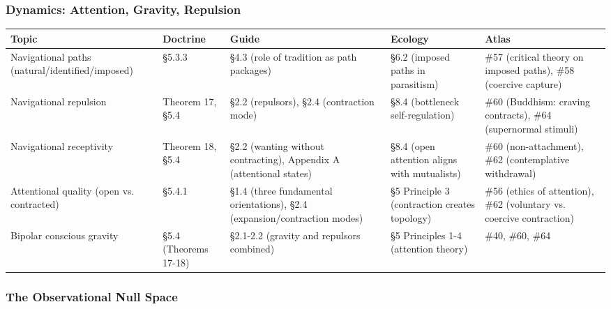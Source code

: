 \subsubsection*{Dynamics: Attention, Gravity, Repulsion}



{\small
\begin{longtable}{>{\raggedright\arraybackslash}p{} >{\raggedright\arraybackslash}p{} >{\raggedright\arraybackslash}p{} >{\raggedright\arraybackslash}p{} >{\raggedright\arraybackslash}p{}}
\toprule
\textbf{Topic} & \textbf{Doctrine} & \textbf{Guide} & \textbf{Ecology} & \textbf{Atlas} \\
\midrule
\endhead
Navigational paths (natural/\allowbreak identified/\allowbreak imposed) & §5.3.3 & §4.3 (role of tradition as path packages) & §6.2 (imposed paths in parasitism) & \#57 (critical theory on imposed paths), \#58 (coercive capture) \\
Navigational repulsion & Theorem 17, §5.4 & §2.2 (repulsors), §2.4 (contraction mode) & §8.4 (bottleneck self-regulation) & \#60 (Buddhism: craving contracts), \#64 (supernormal stimuli) \\
Navigational receptivity & Theorem 18, §5.4 & §2.2 (wanting without contracting), Appendix A (attentional states) & §8.4 (open attention aligns with mutualists) & \#60 (non-attachment), \#62 (contemplative withdrawal) \\
Attentional quality (open vs. contracted) & §5.4.1 & §1.4 (three fundamental orientations), §2.4 (expansion/\allowbreak contraction modes) & §5 Principle 3 (contraction creates topology) & \#56 (ethics of attention), \#62 (voluntary vs. coercive contraction) \\
Bipolar conscious gravity & §5.4 (Theorems 17-18) & §2.1-2.2 (gravity and repulsors combined) & §5 Principles 1-4 (attention theory) & \#40, \#60, \#64 \\
\bottomrule
\end{longtable}
}



\subsubsection*{The Observational Null Space}



